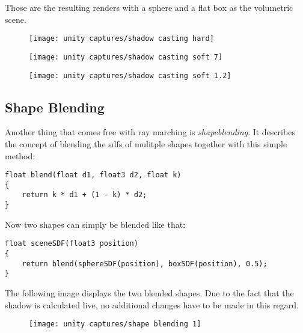 \noindent
Those are the resulting renders with a sphere and a flat box as the volumetric scene.
\begin{figure}[H]
    \centering
        \begin{minipage}{0.3\linewidth}
            \texttt{[image: unity captures/shadow casting hard]}
            \label{img:captures:shadows:hard}
        \end{minipage}
        \hfill
        \begin{minipage}{0.3\linewidth}
            \texttt{[image: unity captures/shadow casting soft 7]}
            \label{img:captures:shadows:soft2}
        \end{minipage}
        \hfill
        \begin{minipage}{0.3\linewidth}
            \texttt{[image: unity captures/shadow casting soft 1.2]}
            \label{img:captures:shadows:soft1}
        \end{minipage}
\end{figure}

\clearpage
\subsection{Shape Blending}
Another thing that comes free with ray marching is \textit{\gls{shapeblending}}. It describes the concept of blending the \gls{sdf}s of mulitple shapes together with this simple method:
\begin{lstlisting}[language=HLSL]
float blend(float d1, float3 d2, float k)
{
    return k * d1 + (1 - k) * d2;
}
\end{lstlisting}

\noindent
Now two shapes can simply be blended like that:
\begin{lstlisting}[language=HLSL]
float sceneSDF(float3 position)
{
    return blend(sphereSDF(position), boxSDF(position), 0.5);
}
\end{lstlisting}

\noindent
The following image displays the two blended shapes. Due to the fact that the shadow is calculated live, no additional changes have to be made in this regard.
\begin{figure}[H]
    \texttt{[image: unity captures/shape blending 1]}
    \label{img:captures:shapeblending1}
\end{figure}

